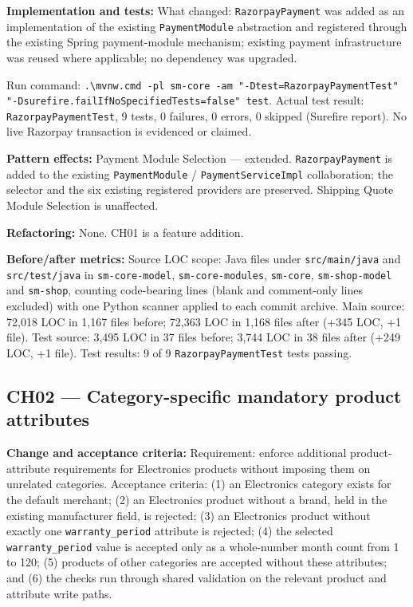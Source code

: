 \documentclass[11pt,a4paper]{article}
\begin{document}
\textbf{Implementation and tests:} What changed: \texttt{Razorpay\allowbreak{}Payment} was added as an implementation of the existing \texttt{Payment\allowbreak{}Module} abstraction and registered through the existing Spring payment-module mechanism; existing payment infrastructure was reused where applicable; no dependency was upgraded.

Run command: \texttt{.\allowbreak{}\textbackslash mvnw.\allowbreak{}cmd -\allowbreak{}pl sm-\allowbreak{}core -\allowbreak{}am "-\allowbreak{}Dtest=RazorpayPaymentTest" "-\allowbreak{}Dsurefire.\allowbreak{}failIfNoSpecifiedTests=false" test}. Actual test result: \texttt{Razorpay\allowbreak{}Payment\allowbreak{}Test}, 9 tests, 0 failures, 0 errors, 0 skipped (Surefire report). No live Razorpay transaction is evidenced or claimed.

\textbf{Pattern effects:} Payment Module Selection --- extended. \texttt{Razorpay\allowbreak{}Payment} is added to the existing \texttt{Payment\allowbreak{}Module} / \texttt{Payment\allowbreak{}Service\allowbreak{}Impl} collaboration; the selector and the six existing registered providers are preserved. Shipping Quote Module Selection is unaffected.

\textbf{Refactoring:} None. CH01 is a feature addition.

\textbf{Before/after metrics:} Source LOC scope: Java files under \texttt{src/main/java} and \texttt{src/test/java} in \texttt{sm-core-model}, \texttt{sm-core-modules}, \texttt{sm-core}, \texttt{sm-shop-model} and \texttt{sm-shop}, counting code-bearing lines (blank and comment-only lines excluded) with one Python scanner applied to each commit archive. Main source: 72,018 LOC in 1,167 files before; 72,363 LOC in 1,168 files after (+345 LOC, +1 file). Test source: 3,495 LOC in 37 files before; 3,744 LOC in 38 files after (+249 LOC, +1 file). Test results: 9 of 9 \texttt{Razorpay\allowbreak{}Payment\allowbreak{}Test} tests passing.

\subsection*{CH02 --- Category-specific mandatory product attributes}

\textbf{Change and acceptance criteria:} Requirement: enforce additional product-attribute requirements for Electronics products without imposing them on unrelated categories. Acceptance criteria: (1) an Electronics category exists for the default merchant; (2) an Electronics product without a brand, held in the existing manufacturer field, is rejected; (3) an Electronics product without exactly one \texttt{warranty\_period} attribute is rejected; (4) the selected \texttt{warranty\_period} value is accepted only as a whole-number month count from 1 to 120; (5) products of other categories are accepted without these attributes; and (6) the checks run through shared validation on the relevant product and attribute write paths.
\end{document}
